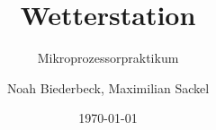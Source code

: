 \documentclass{beamer}
\title{Wetterstation}
\subtitle{Mikroprozessorpraktikum}
\date{\today}
\author{Noah Biederbeck, Maximilian Sackel}
\begin{document}










\begin{frame}[standout]\end{frame}
\end{document}
